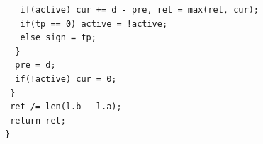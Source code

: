 \documentclass[a4paper,11pt,oneside]{article}
\begin{document}
\begin{multicols*}{\COLS}
\begin{lstlisting}
   if(active) cur += d - pre, ret = max(ret, cur);
   if(tp == 0) active = !active;
   else sign = tp;
  }
  pre = d;
  if(!active) cur = 0;
 }
 ret /= len(l.b - l.a);
 return ret;
}
\end{lstlisting}

\end{multicols*}
\end{document}
